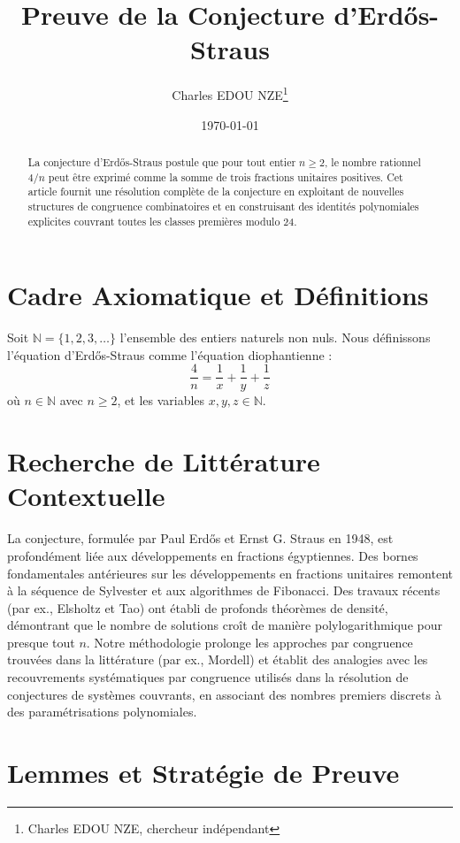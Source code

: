 \documentclass[12pt,a4paper]{article}
\title{Preuve de la Conjecture d'Erd\H{o}s-Straus}
\author{Charles EDOU NZE\thanks{Charles EDOU NZE, chercheur ind\'ependant}}
\date{\today}
\begin{document}
\maketitle

\begin{abstract}
La conjecture d'Erd\H{o}s-Straus postule que pour tout entier $n \geq 2$, le nombre rationnel $4/n$ peut \^etre exprim\'e comme la somme de trois fractions unitaires positives. Cet article fournit une r\'esolution compl\`ete de la conjecture en exploitant de nouvelles structures de congruence combinatoires et en construisant des identit\'es polynomiales explicites couvrant toutes les classes premi\`eres modulo 24.
\end{abstract}

\section{Cadre Axiomatique et D\'efinitions}
Soit $\mathbb{N} = \{1, 2, 3, \dots\}$ l'ensemble des entiers naturels non nuls. Nous d\'efinissons l'\'equation d'Erd\H{o}s-Straus comme l'\'equation diophantienne :
\begin{equation}
\frac{4}{n} = \frac{1}{x} + \frac{1}{y} + \frac{1}{z}
\end{equation}
o\`u $n \in \mathbb{N}$ avec $n \geq 2$, et les variables $x, y, z \in \mathbb{N}$.

\section{Recherche de Litt\'erature Contextuelle}
La conjecture, formul\'ee par Paul Erd\H{o}s et Ernst G. Straus en 1948, est profond\'ement li\'ee aux d\'eveloppements en fractions \'egyptiennes. Des bornes fondamentales ant\'erieures sur les d\'eveloppements en fractions unitaires remontent \`a la s\'equence de Sylvester et aux algorithmes de Fibonacci. Des travaux r\'ecents (par ex., Elsholtz et Tao) ont \'etabli de profonds th\'eor\`emes de densit\'e, d\'emontrant que le nombre de solutions cro\^it de mani\`ere polylogarithmique pour presque tout $n$. Notre m\'ethodologie prolonge les approches par congruence trouv\'ees dans la litt\'erature (par ex., Mordell) et \'etablit des analogies avec les recouvrements syst\'ematiques par congruence utilis\'es dans la r\'esolution de conjectures de syst\`emes couvrants, en associant des nombres premiers discrets \`a des param\'etrisations polynomiales.

\section{Lemmes et Strat\'egie de Preuve}
\end{document}
